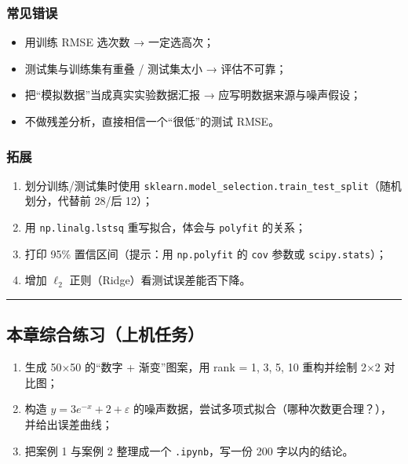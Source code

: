 \subsubsection{常见错误}\label{ux5e38ux89c1ux9519ux8bef-10}

\begin{itemize}
\tightlist
\item
  用训练 RMSE 选次数 → 一定选高次；
\item
  测试集与训练集有重叠 / 测试集太小 → 评估不可靠；
\item
  把``模拟数据''当成真实实验数据汇报 → 应写明数据来源与噪声假设；
\item
  不做残差分析，直接相信一个``很低''的测试 RMSE。
\end{itemize}

\subsubsection{拓展}\label{ux62d3ux5c55-10}

\begin{enumerate}
\def\labelenumi{\arabic{enumi}.}
\tightlist
\item
  划分训练/测试集时使用
  \texttt{sklearn.model\_selection.train\_test\_split}（随机划分，代替前
  28/后 12）；
\item
  用 \texttt{np.linalg.lstsq} 重写拟合，体会与 \texttt{polyfit} 的关系；
\item
  打印 95\% 置信区间（提示：用 \texttt{np.polyfit} 的 \texttt{cov}
  参数或 \texttt{scipy.stats}）；
\item
  增加 \(\ell_2\) 正则（Ridge）看测试误差能否下降。
\end{enumerate}

\begin{center}\rule{0.5\linewidth}{0.5pt}\end{center}

\subsection{本章综合练习（上机任务）}\label{ux672cux7ae0ux7efcux5408ux7ec3ux4e60ux4e0aux673aux4efbux52a1}

\begin{enumerate}
\def\labelenumi{\arabic{enumi}.}
\tightlist
\item
  生成 50×50 的``数字 + 渐变''图案，用 rank = 1, 3, 5, 10 重构并绘制 2×2
  对比图；
\item
  构造 \(y = 3e^{-x} + 2 + \varepsilon\)
  的噪声数据，尝试多项式拟合（哪种次数更合理？），并给出误差曲线；
\item
  把案例 1 与案例 2 整理成一个 \texttt{.ipynb}，写一份 200
  字以内的结论。
\end{enumerate}

